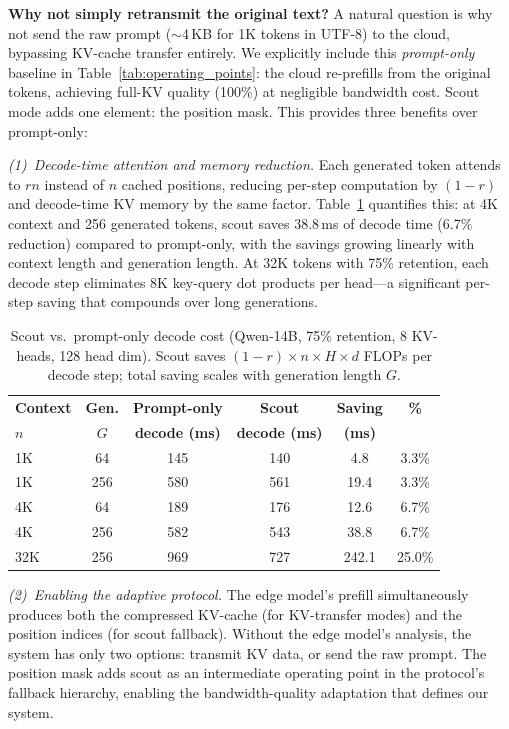 \documentclass[journal]{IEEEtran}
\begin{document}
\textbf{Why not simply retransmit the original text?}
A natural question is why not send the raw prompt ($\sim$4\,KB for 1K tokens in UTF-8) to the cloud, bypassing KV-cache transfer entirely.
We explicitly include this \emph{prompt-only} baseline in Table~\ref{tab:operating_points}: the cloud re-prefills from the original tokens, achieving full-KV quality (100\%) at negligible bandwidth cost.
Scout mode adds one element: the position mask.
This provides three benefits over prompt-only:

\emph{(1)~Decode-time attention and memory reduction.}
Each generated token attends to $rn$ instead of $n$ cached positions, reducing per-step computation by $(1{-}r)$ and decode-time KV memory by the same factor.
Table~\ref{tab:scout_vs_prompt} quantifies this: at 4K context and 256 generated tokens, scout saves 38.8\,ms of decode time (6.7\% reduction) compared to prompt-only, with the savings growing linearly with context length and generation length.
At 32K tokens with 75\% retention, each decode step eliminates 8K key-query dot products per head---a significant per-step saving that compounds over long generations.

\begin{table}[t]
\centering
\caption{Scout vs.\ prompt-only decode cost (Qwen-14B, 75\% retention, 8 KV-heads, 128 head dim). Scout saves $(1{-}r) \times n \times H \times d$ FLOPs per decode step; total saving scales with generation length $G$.}
\label{tab:scout_vs_prompt}
\small
\begin{tabular}{@{}lccccc@{}}
\toprule
\textbf{Context} & \textbf{Gen.} & \textbf{Prompt-only} & \textbf{Scout} & \textbf{Saving} & \textbf{\%} \\
\textbf{$n$} & $G$ & \textbf{decode (ms)} & \textbf{decode (ms)} & \textbf{(ms)} & \\
\midrule
1K    & 64   & 145  & 140  &  4.8  & 3.3\% \\
1K    & 256  & 580  & 561  &  19.4 & 3.3\% \\
4K    & 64   & 189  & 176  &  12.6 & 6.7\% \\
4K    & 256  & 582  & 543  &  38.8 & 6.7\% \\
32K   & 256  & 969  & 727  & 242.1 & 25.0\% \\
\bottomrule
\end{tabular}
\end{table}

\emph{(2)~Enabling the adaptive protocol.}
The edge model's prefill simultaneously produces both the compressed KV-cache (for KV-transfer modes) and the position indices (for scout fallback).
Without the edge model's analysis, the system has only two options: transmit KV data, or send the raw prompt.
The position mask adds scout as an intermediate operating point in the protocol's fallback hierarchy, enabling the bandwidth-quality adaptation that defines our system.
\end{document}
